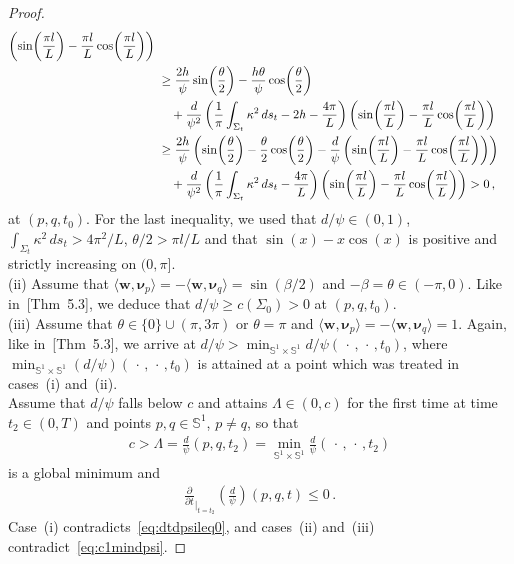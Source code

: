 \documentclass[reqno]{amsart}
\theoremstyle{definition}
\def\bw{\mathbf{w}}
\def\intst{\int_{\St}}
\def\nnu{\boldsymbol{\nu}}
\def\pa{\partial}
\def\Si{\Sigma}
\def\Sp{\Sph^1}
\def\Sph{\mathbb{S}}
\def\St{\Si_t}
\newcommand{\fracp}[2]{{\frac{\pa #1}{\pa #2}}}
\begin{document}
\begin{proof}
\begin{align*}
			\left(\sin\!\left(\frac{\pi l}{L}\right)-\frac{\pi l}{L}\cos\!\left(\frac{\pi l}{L}\right)\right)\notag\\
&\;\geq\frac{2h}\psi\sin\!\left(\frac\theta2\right) 
		-\frac{h\theta}\psi\cos\!\left(\frac\theta2\right)\notag\\
	&\;\quad+\frac{d}{\psi^2}\left(\frac1{\pi}\intst\kappa^2\,ds_t-2h-\frac{4\pi}{L}\right)
			\left(\sin\!\left(\frac{\pi l}{L}\right)-\frac{\pi l}{L}\cos\!\left(\frac{\pi l}{L}\right)\right)\notag\\
&\;\geq\frac{2h}\psi\left(\sin\!\left(\frac\theta2\right)-\frac\theta2\cos\!\left(\frac\theta2\right)
		-\frac d\psi\left(\sin\!\left(\frac{\pi l}{L}\right)-\frac{\pi l}{L}\cos\!\left(\frac{\pi l}{L}\right)\right)\right)\notag\\
	&\;\quad+\frac{d}{\psi^2}\left(\frac1{\pi}\intst\kappa^2\,ds_t-\frac{4\pi}{L}\right)
			\left(\sin\!\left(\frac{\pi l}{L}\right)-\frac{\pi l}{L}\cos\!\left(\frac{\pi l}{L}\right)\right)
			>0\,,
\end{align*}
at $(p,q,t_0)$. 
For the last inequality, we used that $d/\psi\in(0,1)$, $\intst\kappa^2\,ds_t>4\pi^2/L$, $\theta/2>\pi l/L$ and that $\sin(x)-x\cos(x)$ is positive and strictly increasing on $(0,\pi]$.\\

(ii) Assume that $\langle\bw,\nnu_p\rangle=-\langle\bw,\nnu_q\rangle=\sin(\beta/2)$ and $-\beta=\theta\in(-\pi,0)$.
Like in~\cite{Dittberner21}[Thm~5.3], we deduce that $d/\psi\geq c(\Si_0)>0$ at $(p,q,t_0)$. \\

(iii) Assume that $\theta\in\{0\}\cup(\pi,3\pi)$ or $\theta=\pi$ and $\langle\bw,\nnu_p\rangle=-\langle\bw,\nnu_q\rangle=1$. 
Again, like in~\cite{Dittberner21}[Thm~5.3], we arrive at $d/\psi>\min_{\Sp\!\times\Sp}d/\psi(\,\cdot\,,\,\cdot\,,t_0)$,
where $\min_{\Sp\!\times\Sp}(d/\psi)(\,\cdot\,,\,\cdot\,,t_0)$ is attained at a point which was treated in cases~(i) and~(ii). \\

Assume that $d/\psi$ falls below $c$ and attains $\Lambda\in(0,c)$ for the first time at time $t_2\in(0,T)$ and points $p,q\in\Sp$, $p\ne q$, so that
\begin{align}\label{eq:c1mindpsi}
c>\Lambda=\frac d\psi(p,q,t_2)=\min_{\Sp\!\times\Sp}\frac d\psi(\,\cdot\,,\,\cdot\,,t_2)
\end{align}
is a global minimum and
\begin{align}\label{eq:dtdpsileq0}
\fracp{}{t}_{|_{t=t_2}}\!\left(\frac d\psi\right)(p,q,t)\leq0\,.
\end{align}
Case~(i) contradicts~\eqref{eq:dtdpsileq0}, and cases~(ii) and~(iii) contradict~\eqref{eq:c1mindpsi}. 

\end{proof}
\end{document}
